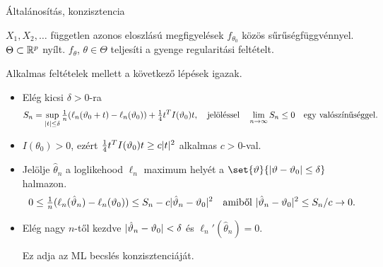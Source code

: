 \documentclass[aspectratio=169,notheorems,9pt,\option]{beamer}
\begin{document}
\begin{frame}[<*>]{Általánosítás, konzisztencia}

    $X_1,X_2,\dots$ független azonos eloszlású megfigyelések $f_{\theta_0}$  közös sűrűségfüggvénnyel. 
    $\Theta\subset\mathbb{R}^p$ nyílt. $f_\theta$, $\theta\in\Theta$ teljesíti a gyenge regularitási feltételt.
  
    Alkalmas feltételek mellett a következő lépések igazak.
   \begin{itemize}
  
      \item Elég kicsi $\delta>0$-ra  
        \begin{displaymath}
          S_n = \sup_{\lvert t\rvert\leq \delta} 
          \tfrac1n(\ell_n(\vartheta_0+t)-\ell_n(\vartheta_0))+ \tfrac14 t^T I(\vartheta_0) t,
          \quad 
          \text{jelöléssel}
          \quad
          \lim_{n\to\infty} S_n\leq 0\quad\text{egy valószínűséggel.}
        \end{displaymath}
      \item $I(\theta_0)>0$, ezért $\frac14 t^T I(\vartheta_0) t \geq c\lvert t\rvert^2$ alkalmas $c>0$-val.
      \item Jelölje $\hat\theta_n$ a loglikehood $\ell_n$ maximum helyét 
      a $\set{\theta}{\abs{\theta-\theta_0}\leq\delta}$ halmazon.  
        \begin{displaymath}
          0\leq \tfrac1n\zjel{\ell_n(\hat\theta_n)-\ell_n(\theta_0)}
          \leq S_n-c\abs{\hat\theta_n-\theta_0}^2 %
          \quad\text{amiből $\abs{\hat\theta_n-\theta_0}^2\leq S_n/c\to 0$}.
        \end{displaymath}
      \item Elég nagy $n$-től kezdve $\lvert\hat{\vartheta}_n-\vartheta_0\rvert<\delta$ és $\ell_n'(\hat\theta_n)=0$.
      
      Ez adja az ML becslés konzisztenciáját.
    \end{itemize}
  \end{frame}
  
\end{document}
